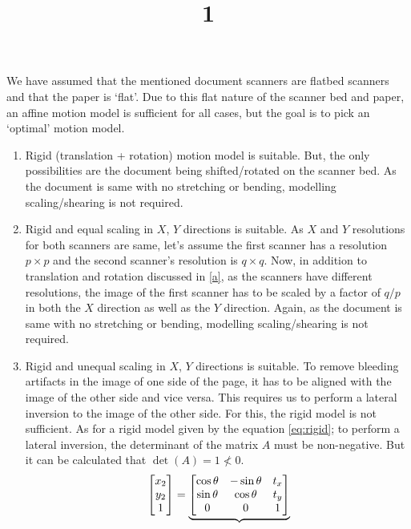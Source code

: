 \documentclass[a4paper]{article}
\title{1}
\date{}
\begin{document}
\maketitle
We have assumed that the mentioned document scanners are flatbed scanners and that the paper is `flat'. Due to this flat nature of the scanner bed and paper, an affine motion model is sufficient for all cases, but the goal is to pick an `optimal' motion model.
\begin{enumerate}[label=(\alph*)]
	\item \label{a} Rigid (translation + rotation) motion model is suitable. But, the only possibilities are the document being shifted/rotated on the scanner bed. As the document is same with no stretching or bending, modelling scaling/shearing is not required.
	\item Rigid and equal scaling in $X$, $Y$ directions is suitable. As $X$ and $Y$ resolutions for both scanners are same, let's assume the first scanner has a resolution $p \times p$ and the second scanner's resolution is $q \times q$. Now, in addition to translation and rotation discussed in \ref{a}, as the scanners have different resolutions, the image of the first scanner has to be scaled by a factor of $q/p$ in both the $X$ direction as well as the $Y$ direction. Again, as the document is same with no stretching or bending, modelling scaling/shearing is not required.
	\item Rigid and unequal scaling in $X$, $Y$ directions is suitable. To remove bleeding artifacts in the image of one side of the page, it has to be aligned with the image of the other side and vice versa. This requires us to perform a lateral inversion to the image of the other side. For this, the rigid model is not sufficient. As for a rigid model given by the equation \ref{eq:rigid}; to perform a lateral inversion, the determinant of the matrix $A$ must be non-negative. But it can be calculated that $\operatorname{det}(A)=1 \nless 0$.
	\begin{equation}{\label{eq:rigid}}
		\begin{bmatrix}
			x_2\\y_2\\1
		\end{bmatrix}
		=
		\underbrace{
		\begin{bmatrix}
			\cos\theta & -\sin\theta & t_x\\
			\sin\theta & \cos\theta  & t_y\\
			0          & 0           & 1\\
		\end{bmatrix}
}
\end{equation}
\end{enumerate}
\end{document}
